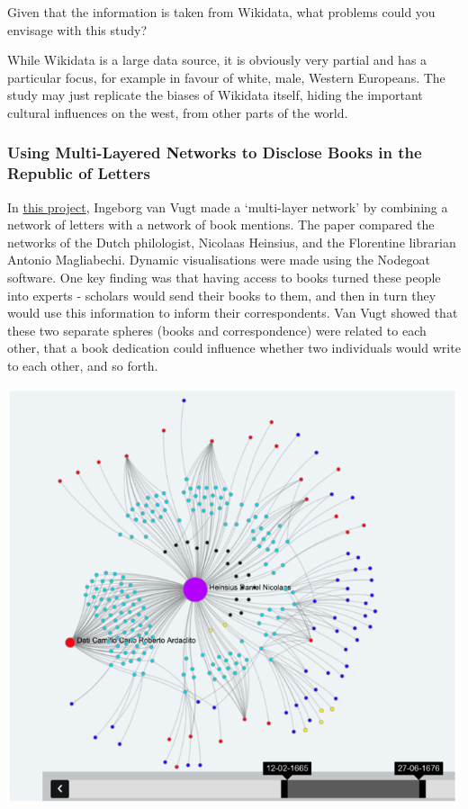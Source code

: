 \documentclass[
]{book}
\begin{document}
Given that the information is taken from Wikidata, what problems could you envisage with this study?

While Wikidata is a large data source, it is obviously very partial and has a particular focus, for example in favour of white, male, Western Europeans. The study may just replicate the biases of Wikidata itself, hiding the important cultural influences on the west, from other parts of the world.

\hypertarget{using-multi-layered-networks-to-disclose-books-in-the-republic-of-letters}{%
\subsubsection{\texorpdfstring{\textbf{Using Multi-Layered Networks to Disclose Books in the Republic of Letters}}{Using Multi-Layered Networks to Disclose Books in the Republic of Letters}}\label{using-multi-layered-networks-to-disclose-books-in-the-republic-of-letters}}

In \href{https://jhnr.uni.lu/index.php/jhnr/article/view/7}{this project}, Ingeborg van Vugt made a `multi-layer network' by combining a network of letters with a network of book mentions. The paper compared the networks of the Dutch philologist, Nicolaas Heinsius, and the Florentine librarian Antonio Magliabechi. Dynamic visualisations were made using the Nodegoat software. One key finding was that having access to books turned these people into experts - scholars would send their books to them, and then in turn they would use this information to inform their correspondents. Van Vugt showed that these two separate spheres (books and correspondence) were related to each other, that a book dedication could influence whether two individuals would write to each other, and so forth.

\includegraphics[width=5.20833in,height=\textheight]{images/Screenshot 2022-10-03 at 11.23.15.png}
\end{document}
